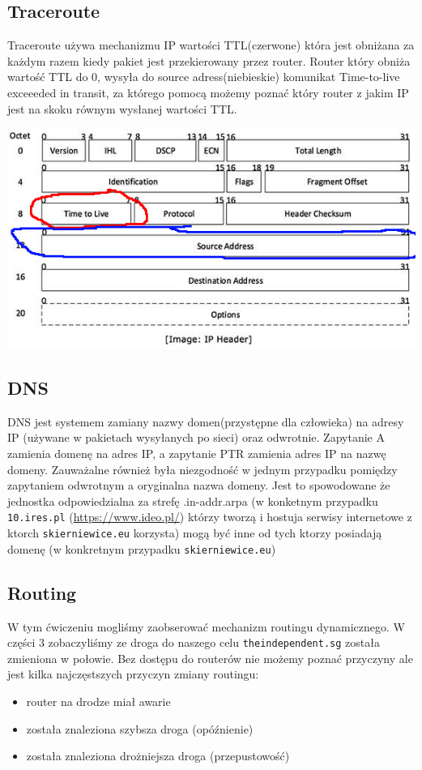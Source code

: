 \documentclass[11pt]{article}
\begin{document}
\subsection{Traceroute}
\label{sec:org25777b8}
Traceroute używa mechanizmu IP wartości TTL(czerwone) która jest obniżana za każdym razem kiedy pakiet jest przekierowany przez router. Router który obniża wartość TTL do 0, wysyła do source adress(niebieskie)  komunikat Time-to-live exceeeded in transit, za którego pomocą możemy poznać który router z jakim IP jest na skoku równym wysłanej wartości TTL.
\begin{center}
\includegraphics[width=.9\linewidth]{./ip_header.jpg}
\end{center}

\subsection{DNS}
\label{sec:orga89b315}
DNS jest systemem zamiany nazwy domen(przystępne dla człowieka) na adresy IP (używane w pakietach wysyłanych po sieci) oraz odwrotnie.
Zapytanie A zamienia domenę na adres IP, a zapytanie PTR zamienia adres IP na nazwę domeny. Zauważalne również była niezgodność w jednym przypadku pomiędzy zapytaniem odwrotnym a oryginalna nazwa domeny. Jest to spowodowane że jednostka odpowiedzialna za strefę .in-addr.arpa (w konketnym przypadku \texttt{10.ires.pl} (\url{https://www.ideo.pl/}) którzy tworzą i hostuja serwisy internetowe z ktorch \texttt{skierniewice.eu} korzysta) mogą być inne od tych ktorzy posiadają domenę (w konkretnym przypadku \texttt{skierniewice.eu})

\subsection{Routing}
\label{sec:org2c450e2}
W tym ćwiczeniu mogliśmy zaobserować mechanizm routingu dynamicznego. W części 3 zobaczyliśmy ze droga do naszego celu \texttt{theindependent.sg} została zmieniona w połowie. Bez dostępu do routerów nie możemy poznać przyczyny ale jest kilka najczęstszych przyczyn zmiany routingu:
\begin{itemize}
\item router na drodze miał awarie
\item została znaleziona szybsza droga (opóźnienie)
\item została znaleziona drożniejsza droga (przepustowość)
\end{itemize}
\end{document}
